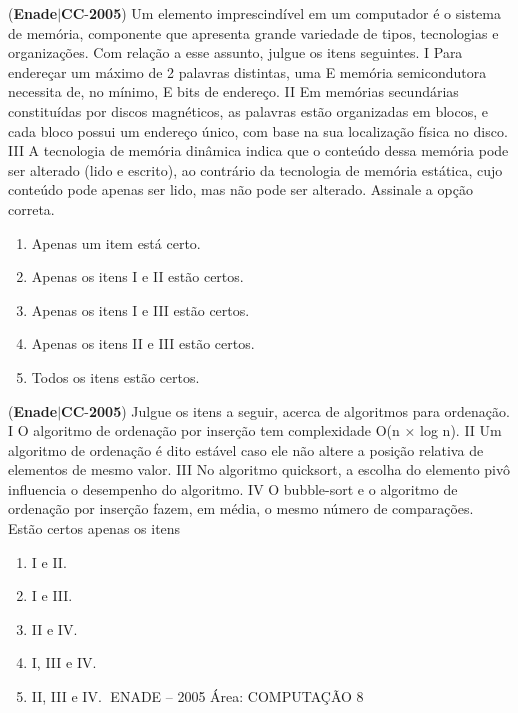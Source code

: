 \documentclass{exam}
\begin{document}
\begin{questions}
\begin{enumerate}[label=\alph*)]
	\end{enumerate}

\question (\textbf{Enade}$|$\textbf{CC}-\textbf{2005}) Um elemento imprescindível em um computador é o sistema de
memória, componente que apresenta grande variedade de tipos,
tecnologias e organizações. Com relação a esse assunto, julgue
os itens seguintes.
I Para endereçar um máximo de 2 palavras distintas, uma
E
memória semicondutora necessita de, no mínimo, E bits de
endereço.
II Em memórias secundárias constituídas por discos
magnéticos, as palavras estão organizadas em blocos, e cada
bloco possui um endereço único, com base na sua
localização física no disco.
III A tecnologia de memória dinâmica indica que o conteúdo
dessa memória pode ser alterado (lido e escrito), ao
contrário da tecnologia de memória estática, cujo conteúdo
pode apenas ser lido, mas não pode ser alterado.
Assinale a opção correta.
	\begin{enumerate}[label=\alph*)]
		\item  Apenas um item está certo.
		\item  Apenas os itens I e II estão certos.
		\item  Apenas os itens I e III estão certos.
		\item  Apenas os itens II e III estão certos.
		\item  Todos os itens estão certos.

	\end{enumerate}

\question (\textbf{Enade}$|$\textbf{CC}-\textbf{2005}) Julgue os itens a seguir, acerca de algoritmos para ordenação.
I O algoritmo de ordenação por inserção tem complexidade
O(n × log n).
II Um algoritmo de ordenação é dito estável caso ele não altere
a posição relativa de elementos de mesmo valor.
III No algoritmo quicksort, a escolha do elemento pivô
influencia o desempenho do algoritmo.
IV O bubble-sort e o algoritmo de ordenação por inserção
fazem, em média, o mesmo número de comparações.
Estão certos apenas os itens
	\begin{enumerate}[label=\alph*)]
		\item  I e II.
		\item  I e III.
		\item  II e IV.
		\item  I, III e IV.
		\item  II, III e IV.
ENADE – 2005 Área: COMPUTAÇÃO 8

	\end{enumerate}


\end{questions}
\end{document}
